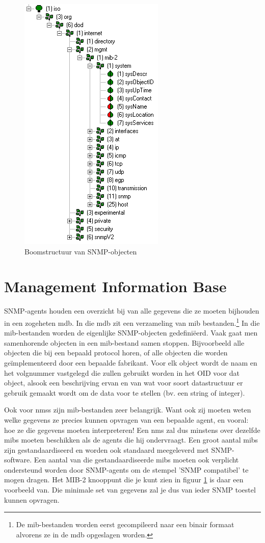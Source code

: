 \begin{figure}[h]
	\centering
	\includegraphics{figures/snmp/OID_tree}
	\caption{Boomstructuur van SNMP-objecten}
	\label{boomstructuur}
\end{figure}


\section{Management Information Base}
SNMP-agents houden een overzicht bij van alle gegevens die ze moeten bijhouden in een zogeheten \gls{mdb}.
In die \gls{mdb} zit een verzameling van \gls{mib} bestanden.\footnote{De \gls{mib}-bestanden worden eerst gecompileerd naar een binair formaat
alvorens ze in de \gls{mdb} opgeslagen worden.\cite{moreau}}
In die \gls{mib}-bestanden worden de eigenlijke SNMP-objecten gedefiniëerd. Vaak gaat men samenhorende objecten in een \gls{mib}-bestand samen stoppen.
Bijvoorbeeld alle objecten die bij een bepaald protocol horen, of alle objecten die worden geïmplementeerd door een bepaalde fabrikant.
Voor elk object wordt de naam en het volgnummer vastgelegd die zullen gebruikt worden in het OID voor dat object, alsook een beschrijving ervan en
van wat voor soort datastructuur er gebruik gemaakt wordt om de data voor te stellen (bv. een string of integer).

Ook voor \glspl{nms} zijn \gls{mib}-bestanden zeer belangrijk. Want ook zij moeten weten welke gegevens ze precies kunnen opvragen van een bepaalde
agent, en vooral: hoe ze die gegevens moeten interpreteren! Een \gls{nms} zal dus minstens over dezelfde \glspl{mib} moeten beschikken als de
agents die hij ondervraagt. Een groot aantal \glspl{mib} zijn gestandaardiseerd en worden ook standaard meegeleverd met SNMP-software.
Een aantal van die gestandaardiseerde \glspl{mib} moeten ook verplicht ondersteund worden door SNMP-agents om de stempel 'SNMP compatibel' te mogen dragen.
Het MIB-2 knooppunt die je kunt zien in figuur \ref{boomstructuur} is daar een voorbeeld van.
Die minimale set van gegevens zal je dus van ieder SNMP toestel kunnen opvragen.


